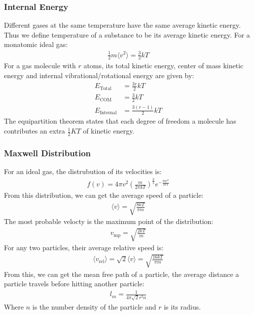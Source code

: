 \documentclass[11pt]{article}
\begin{document}
\begin{multicols*}{3}
\subsubsection{Internal Energy}
Different gases at the same temperature have the same average kinetic energy. Thus we define temperature of a substance to be its average kinetic energy. For a monatomic ideal gas:
\begin{align*}
  \frac{1}{2}m\langle v^2 \rangle = \frac{3}{2}kT
\end{align*}
\noindent
For a gas molecule with $r$ atoms, its total kinetic energy, center of mass kinetic energy and internal vibrational/rotational energy are given by:
\begin{align*}
  E_{\text{Total}} &= \frac{3r}{2}kT \\
  E_{\text{COM}} &= \frac{3}{2}kT \\
  E_{\text{Internal}} &= \frac{3(r-1)}{2}kT 
\end{align*}
\noindent
The equipartition theorem states that each degree of freedom a molecule has contributes an extra $\frac{1}{2}KT$ of kinetic energy.

\subsubsection{Maxwell Distribution}
For an ideal gas, the distrubution of its velocities is:
\begin{align*}
  f(v) = 4 \pi v^2 \left( \frac{m}{2 \pi kT} \right)^{\frac{3}{2}} 
  e^{-\frac{mv^2}{2kT}}
\end{align*}
From this distribution, we can get the average speed of a particle:
\begin{align*}
  \langle v \rangle = \sqrt{\frac{8kT}{\pi m}}
\end{align*}
The most probable velocty is the maximum point of the distribution:
\begin{align*}
  v_{\text{mp}} = \sqrt{\frac{2kT}{m}}
\end{align*}
For any two particles, their average relative speed is:
\begin{align*}
  \langle v_{\text{rel}} \rangle = \sqrt{2} \langle v \rangle = 
  \sqrt{\frac{16kT}{\pi m}}
\end{align*}
From this, we can get the mean free path of a particle, the average distance a particle travels before hitting another particle:
\begin{align*}
  l_m = \frac{1}{4 \pi \sqrt{2} r^2 n}
\end{align*}
Where $n$ is the number density of the particle and $r$ is its radius.


\end{multicols*}
\end{document}
